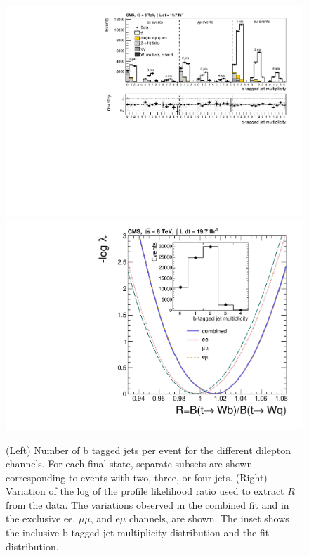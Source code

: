 \documentclass[a4paper]{PoS}
\begin{document}
\begin{figure}
\includegraphics[width=.57\textwidth]{figures/CMS-TOP-12-035_Figure_002}
\includegraphics[width=.33\textwidth]{figures/CMS-TOP-12-035_Figure_006}
\caption{(Left) Number of b tagged jets per event for the different dilepton
  channels. For each final state, separate subsets are shown corresponding to
  events with two, three, or four jets. (Right) Variation of the log of the
  profile likelihood ratio used to extract $R$ from the data. The variations
  observed in the combined fit and in the exclusive ee, $\mu\mu$, and e$\mu$
  channels, are shown. The inset shows the inclusive b tagged jet multiplicity
  distribution and the fit distribution.}
\label{fig:CMS-TOP-12-035}
\end{figure}
\end{document}
